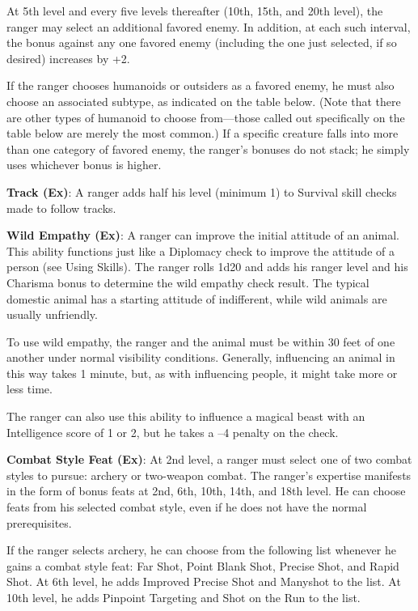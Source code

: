 At 5th level and every five levels thereafter (10th, 15th, and 20th level), the ranger may select an additional favored enemy. In addition, at each such interval, the bonus against any one favored enemy (including the one just selected, if so desired) increases by +2. 
				
If the ranger chooses humanoids or outsiders as a favored enemy, he must also choose an associated subtype, as indicated on the table below. (Note that there are other types of humanoid to choose from---those called out specifically on the table below are merely the most common.) If a specific creature falls into more than one category of favored enemy, the ranger's bonuses do not stack; he simply uses whichever bonus is higher.
				
\textbf{Track (Ex)}: A ranger adds half his level (minimum 1) to Survival skill checks made to follow tracks.
				
\textbf{Wild Empathy (Ex)}: A ranger can improve the initial attitude of an animal. This ability functions just like a Diplomacy check to improve the attitude of a person (see Using Skills). The ranger rolls 1d20 and adds his ranger level and his Charisma bonus to determine the wild empathy check result. The typical domestic animal has a starting attitude of indifferent, while wild animals are usually unfriendly.
				
To use wild empathy, the ranger and the animal must be within 30 feet of one another under normal visibility conditions. Generally, influencing an animal in this way takes 1 minute, but, as with influencing people, it might take more or less time.
				
The ranger can also use this ability to influence a magical beast with an Intelligence score of 1 or 2, but he takes a --4 penalty on the check.
				
\textbf{Combat Style Feat (Ex)}: At 2nd level, a ranger must select one of two combat styles to pursue: archery or two-weapon combat. The ranger's expertise manifests in the form of bonus feats at 2nd, 6th, 10th, 14th, and 18th level. He can choose feats from his selected combat style, even if he does not have the normal prerequisites.
				
If the ranger selects archery, he can choose from the following list whenever he gains a combat style feat: Far Shot, Point Blank Shot, Precise Shot, and Rapid Shot. At 6th level, he adds Improved Precise Shot and Manyshot to the list. At 10th level, he adds Pinpoint Targeting and Shot on the Run to the list.
				
